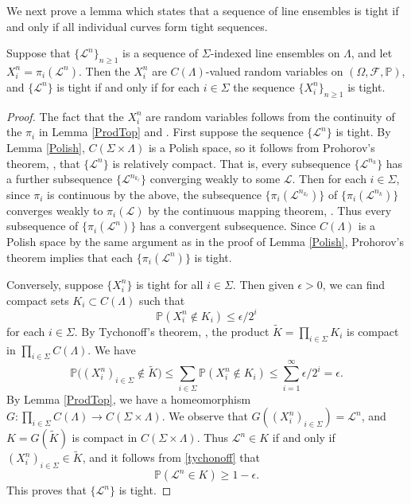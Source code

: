 We next prove a lemma which states that a sequence of line ensembles is tight if and only if all individual curves form tight sequences.

\begin{lemma}\label{ProjTight}
	Suppose that $\{\mathcal{L}^n\}_{n\geq 1}$ is a sequence of $\Sigma$-indexed line ensembles on $\Lambda$, and let $X_i^n = \pi_i(\mathcal{L}^n)$. Then the $X_i^n$ are $C(\Lambda)$-valued random variables on $(\Omega,\mathcal{F},\mathbb{P})$, and $\{\mathcal{L}^n\}$ is tight if and only if for each $i \in \Sigma$ the sequence $\{X_i^n\}_{n\geq 1}$ is tight.
	
\end{lemma}

\begin{proof}

The fact that the $X_i^n$ are random variables follows from the continuity of the $\pi_i$ in Lemma \ref{ProdTop} and \cite[Theorem 1.3.5]{Durrett}. First suppose the sequence $\{\mathcal{L}^n\}$ is tight. By Lemma \ref{Polish}, $C(\Sigma\times\Lambda)$ is a Polish space, so it follows from Prohorov's theorem, \cite[Theorem 5.1]{Billing}, that $\{\mathcal{L}^n\}$ is relatively compact. That is, every subsequence $\{\mathcal{L}^{n_k}\}$ has a further subsequence $\{\mathcal{L}^{n_{k_\ell}}\}$ converging weakly to some $\mathcal{L}$. Then for each $i\in\Sigma$, since $\pi_i$ is continuous by the above, the subsequence $\{\pi_i(\mathcal{L}^{n_{k_\ell}})\}$ of $\{\pi_i(\mathcal{L}^{n_k})\}$ converges weakly to $\pi_i(\mathcal{L})$ by the continuous mapping theorem, \cite[Theorem 3.2.10]{Durrett}. Thus every subsequence of $\{\pi_i(\mathcal{L}^n)\}$ has a convergent subsequence. Since $C(\Lambda)$ is a Polish space by the same argument as in the proof of Lemma \ref{Polish}, Prohorov's theorem implies that each $\{\pi_i(\mathcal{L}^n)\}$ is tight.

Conversely, suppose $\{X_i^n\}$ is tight for all $i\in\Sigma$. Then given $\epsilon > 0$, we can find compact sets $K_i\subset C(\Lambda)$ such that
\[
\mathbb{P}(X_i^n \notin K_i) \leq \epsilon/2^i
\]
for each $i\in\Sigma$. By Tychonoff's theorem, \cite[Theorem 37.3]{Munkres}, the product $\tilde{K} = \prod_{i\in\Sigma} K_i$ is compact in $\prod_{i\in\Sigma} C(\Lambda)$. We have
\begin{equation}\label{tychonoff}
\mathbb{P}\big((X_i^n)_{i\in\Sigma} \notin \tilde{K} \big) \leq \sum_{i\in\Sigma} \mathbb{P}(X_i^n \notin K_i) \leq \sum_{i=1}^\infty \epsilon/2^i = \epsilon.
\end{equation}
By Lemma \ref{ProdTop}, we have a homeomorphism $G : \prod_{i\in\Sigma} C(\Lambda) \to C(\Sigma\times\Lambda)$. We observe that $G((X_i^n)_{i\in\Sigma}) = \mathcal{L}^n$, and $K = G(\tilde{K})$ is compact in $C(\Sigma\times\Lambda)$. Thus $\mathcal{L}^n \in K$ if and only if $(X_i^n)_{i\in\Sigma} \in \tilde{K}$, and it follows from \eqref{tychonoff} that
\[
\mathbb{P}(\mathcal{L}^n \in K) \geq 1 - \epsilon.
\]
This proves that $\{\mathcal{L}^n\}$ is tight.

\end{proof}

